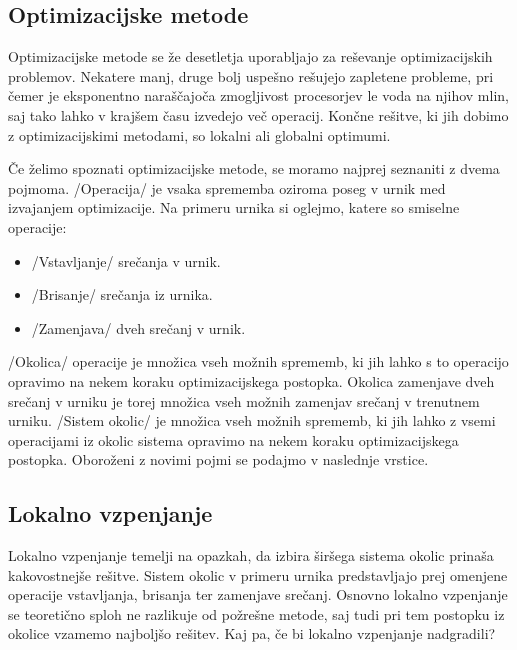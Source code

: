 \documentclass[a4paper, 10pt]{article}
\begin{document}
\subsection{Optimizacijske metode}

Optimizacijske metode se že desetletja uporabljajo za reševanje optimizacijskih problemov.
Nekatere manj, druge bolj uspešno rešujejo zapletene probleme, pri čemer je eksponentno
naraščajoča zmogljivost procesorjev le voda na njihov mlin, saj tako lahko v krajšem
času izvedejo več operacij. Končne rešitve, ki jih dobimo z optimizacijskimi metodami,
so lokalni ali globalni optimumi.

Če želimo spoznati optimizacijske metode, se moramo najprej seznaniti z dvema pojmoma.
/Operacija/ je vsaka sprememba oziroma poseg v urnik med izvajanjem optimizacije.
Na primeru urnika si oglejmo, katere so smiselne operacije:

\begin{itemize}
   \item /Vstavljanje/ srečanja v urnik.
   \item /Brisanje/ srečanja iz urnika.
   \item /Zamenjava/ dveh srečanj v urnik.
\end{itemize}

/Okolica/ operacije je množica vseh možnih sprememb, ki jih lahko s to operacijo
opravimo na nekem koraku optimizacijskega postopka. Okolica zamenjave dveh srečanj v urniku
je torej množica vseh možnih zamenjav srečanj v trenutnem urniku.
/Sistem okolic/ je množica vseh možnih sprememb, ki jih lahko z vsemi operacijami iz
okolic sistema opravimo na nekem koraku optimizacijskega postopka. Oboroženi z novimi pojmi
se podajmo v naslednje vrstice.

\subsection{Lokalno vzpenjanje}

Lokalno vzpenjanje temelji na opazkah, da izbira širšega sistema okolic prinaša kakovostnejše
rešitve. Sistem okolic v primeru urnika predstavljajo prej omenjene operacije vstavljanja,
brisanja ter zamenjave srečanj. Osnovno lokalno vzpenjanje se teoretično sploh ne razlikuje
od požrešne metode, saj tudi pri tem postopku iz okolice vzamemo najboljšo rešitev. Kaj pa,
če bi lokalno vzpenjanje nadgradili?
\end{document}

